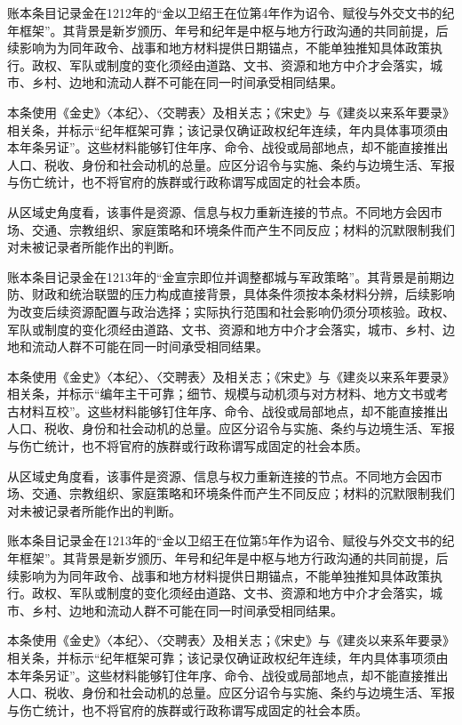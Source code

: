 账本条目记录金在1212年的“金以卫绍王在位第4年作为诏令、赋役与外交文书的纪年框架”。其背景是新岁颁历、年号和纪年是中枢与地方行政沟通的共同前提，后续影响为为同年政令、战事和地方材料提供日期锚点，不能单独推知具体政策执行。政权、军队或制度的变化须经由道路、文书、资源和地方中介才会落实，城市、乡村、边地和流动人群不可能在同一时间承受相同结果。

本条使用《金史》〈本纪〉、〈交聘表〉及相关志；《宋史》与《建炎以来系年要录》相关条，并标示“纪年框架可靠；该记录仅确证政权纪年连续，年内具体事项须由本年条另证”。这些材料能够钉住年序、命令、战役或局部地点，却不能直接推出人口、税收、身份和社会动机的总量。应区分诏令与实施、条约与边境生活、军报与伤亡统计，也不将官府的族群或行政称谓写成固定的社会本质。

从区域史角度看，该事件是资源、信息与权力重新连接的节点。不同地方会因市场、交通、宗教组织、家庭策略和环境条件而产生不同反应；材料的沉默限制我们对未被记录者所能作出的判断。

账本条目记录金在1213年的“金宣宗即位并调整都城与军政策略”。其背景是前期边防、财政和统治联盟的压力构成直接背景，具体条件须按本条材料分辨，后续影响为改变后续资源配置与政治选择；实际执行范围和社会影响仍须分项核验。政权、军队或制度的变化须经由道路、文书、资源和地方中介才会落实，城市、乡村、边地和流动人群不可能在同一时间承受相同结果。

本条使用《金史》〈本纪〉、〈交聘表〉及相关志；《宋史》与《建炎以来系年要录》相关条，并标示“编年主干可靠；细节、规模与动机须与对方材料、地方文书或考古材料互校”。这些材料能够钉住年序、命令、战役或局部地点，却不能直接推出人口、税收、身份和社会动机的总量。应区分诏令与实施、条约与边境生活、军报与伤亡统计，也不将官府的族群或行政称谓写成固定的社会本质。

从区域史角度看，该事件是资源、信息与权力重新连接的节点。不同地方会因市场、交通、宗教组织、家庭策略和环境条件而产生不同反应；材料的沉默限制我们对未被记录者所能作出的判断。

账本条目记录金在1213年的“金以卫绍王在位第5年作为诏令、赋役与外交文书的纪年框架”。其背景是新岁颁历、年号和纪年是中枢与地方行政沟通的共同前提，后续影响为为同年政令、战事和地方材料提供日期锚点，不能单独推知具体政策执行。政权、军队或制度的变化须经由道路、文书、资源和地方中介才会落实，城市、乡村、边地和流动人群不可能在同一时间承受相同结果。

本条使用《金史》〈本纪〉、〈交聘表〉及相关志；《宋史》与《建炎以来系年要录》相关条，并标示“纪年框架可靠；该记录仅确证政权纪年连续，年内具体事项须由本年条另证”。这些材料能够钉住年序、命令、战役或局部地点，却不能直接推出人口、税收、身份和社会动机的总量。应区分诏令与实施、条约与边境生活、军报与伤亡统计，也不将官府的族群或行政称谓写成固定的社会本质。

